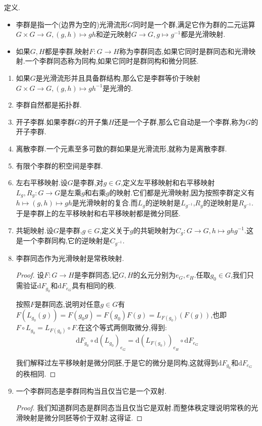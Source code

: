 定义.
\begin{itemize}
	\item 李群是指一个(边界为空的)光滑流形$G$同时是一个群,满足它作为群的二元运算$G\times G\to G,(g,h)\mapsto gh$和逆元映射$G\to G,g\mapsto g^{-1}$都是光滑映射.
	\item 如果$G,H$都是李群,映射$F:G\to H$称为李群同态,如果它同时是群同态和光滑映射.一个李群同态称为同构,如果它同时是群同构和微分同胚.
\end{itemize}
\begin{enumerate}
	\item 如果$G$是光滑流形并且具备群结构,那么它是李群等价于映射$G\times G\to G,(g,h)\mapsto gh^{-1}$是光滑的.
	\item 李群自然都是拓扑群.
	\item 开子李群.如果李群$G$的开子集$H$还是一个子群,那么它自动是一个李群,称为$G$的开子李群.
	\item 离散李群.一个元素至多可数的群如果是光滑流形,就称为是离散李群.
	\item 有限个李群的积空间是李群.
	\item 左右平移映射.设$G$是李群,对$g\in G$,定义左平移映射和右平移映射$L_g,R_g:G\to G$是左乘$g$和右乘$g$的映射.它们都是光滑映射,因为按照李群定义有$h\mapsto(g,h)\mapsto gh$是光滑映射的复合.而$L_g$的逆映射是$L_{g^{-1}}$,$R_g$的逆映射是$R_{g^{-1}}$.于是李群上的左平移映射和右平移映射都是微分同胚.
	\item 共轭映射.设$G$是李群,$g\in G$,定义关于$g$的共轭映射为$C_g:G\to G,h\mapsto ghg^{-1}$.这是一个李群同构,它的逆映射是$C_{g^{-1}}$.
	\item 李群同态作为光滑映射是常秩映射.
	\begin{proof}
		
		设$F:G\to H$是李群同态,记$G,H$的幺元分别为$e_G,e_H$.任取$g_0\in G$,我们只需验证$\mathrm{d}F_{g_0}$和$\mathrm{d}F_{e_G}$具有相同的秩.
		
		按照$F$是群同态,说明对任意$g\in G$有$F(L_{g_0}(g))=F(g_0g)=F(g_0)F(g)=L_{F(g_0)}(F(g))$,也即$F\circ L_{g_0}=L_{F(g_0)}\circ F$.在这个等式两侧取微分,得到:
		$$\mathrm{d}F_{g_0}\circ\mathrm{d}(L_{g_0})_{e_G}=\mathrm{d}(L_{F(g_0)})_{e_H}\circ\mathrm{d}F_{e_G}$$
		
		我们解释过左平移映射是微分同胚,于是它的微分是同构,这就得到$\mathrm{d}F_{g_0}$和$\mathrm{d}F_{e_G}$的秩相同.
	\end{proof}
    \item 一个李群同态是李群同构当且仅当它是一个双射.
    \begin{proof}
    	
    	我们知道群同态是群同态当且仅当它是双射.而整体秩定理说明常秩的光滑映射是微分同胚等价于双射.这得证.
    \end{proof}
\end{enumerate}

